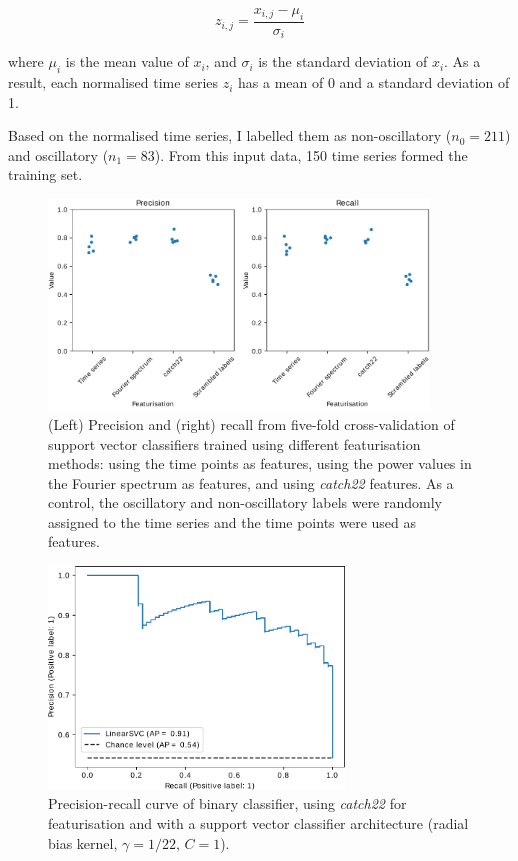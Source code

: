 \begin{equation}
  z_{i,j} = \frac{x_{i,j} - \mu_{i}}{\sigma_{i}}
  \label{eq:analysis-stdscore}
\end{equation}

where $\mu_{i}$ is the mean value of $x_{i}$, and $\sigma_{i}$ is the standard deviation of $x_{i}$.
As a result, each normalised time series $z_{i}$ has a mean of 0 and a standard deviation of 1.

Based on the normalised time series, I labelled them as non-oscillatory ($n_{0}=211$) and oscillatory ($n_{1}=83$).
From this input data, 150 time series formed the training set.

\begin{figure}
  \centering
  \includegraphics[width=0.9\textwidth]{svm_feat_compare_edit.pdf}
  \caption[
  ]{
    (Left) Precision and (right) recall from five-fold cross-validation of support vector classifiers trained using different featurisation methods:
    using the time points as features,
    using the power values in the Fourier spectrum as features,
    and using \emph{catch22} features.
    As a control, the oscillatory and non-oscillatory labels were randomly assigned to the time series and the time points were used as features.
  }
  \label{fig:analysis-precision-recall}
\end{figure}

\begin{figure}
  \centering
  \includegraphics[width=0.7\textwidth]{svm_1_edit.pdf}
  \caption[
    Mean values of each \texttt{catch22} feature across each cell
  ]{
    Precision-recall curve of binary classifier, using \textit{catch22} for featurisation and with a support vector classifier architecture (radial bias kernel, $\gamma = 1/22$, $C = 1$).
  }
  \label{fig:analysis-svc-pr}
\end{figure}

